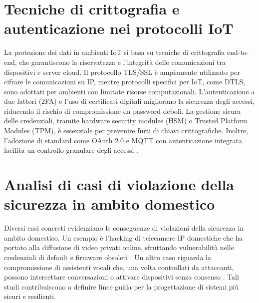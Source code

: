 \section{Tecniche di crittografia e autenticazione nei protocolli IoT}
La protezione dei dati in ambienti IoT si basa su tecniche di crittografia end-to-end, che garantiscono la riservatezza e l'integrità delle comunicazioni tra dispositivi e server cloud. Il protocollo TLS/SSL è ampiamente utilizzato per cifrare le comunicazioni su IP, mentre protocolli specifici per IoT, come DTLS, sono adottati per ambienti con limitate risorse computazionali. L'autenticazione a due fattori (2FA) e l'uso di certificati digitali migliorano la sicurezza degli accessi, riducendo il rischio di compromissione da password deboli. La gestione sicura delle credenziali, tramite hardware security modules (HSM) o Trusted Platform Modules (TPM), è essenziale per prevenire furti di chiavi crittografiche. Inoltre, l'adozione di standard come OAuth 2.0 e MQTT con autenticazione integrata facilita un controllo granulare degli accessi \parencite{sicari2015, yang2017}.

\section{Analisi di casi di violazione della sicurezza in ambito domestico}
Diversi casi concreti evidenziano le conseguenze di violazioni della sicurezza in ambito domestico. Un esempio è l'hacking di telecamere IP domestiche che ha portato alla diffusione di video privati online, sfruttando vulnerabilità nelle credenziali di default e firmware obsoleti \parencite{ringIncident}. Un altro caso riguarda la compromissione di assistenti vocali che, una volta controllati da attaccanti, possono intercettare conversazioni o attivare dispositivi senza consenso \parencite{nestIncident}. Tali studi contribuiscono a definire linee guida per la progettazione di sistemi più sicuri e resilienti.
